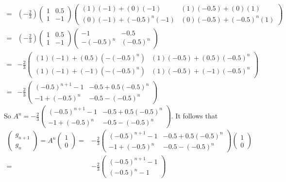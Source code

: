 \documentclass[12pt]{article}
\newenvironment{solution}[1][Solution]
{
	\begin{trivlist} 
		\item[\hskip \labelsep {\itshape #1:}]
	}
	{
	\end{trivlist}
}
\begin{document}
\begin{solution}
\begin{align*}
=&\left( -\frac{2}{3} \right) \begin{pmatrix}1&0.5\\1&-1\end{pmatrix} \begin{pmatrix} (1)(-1)+(0)(-1)&(1)(-0.5)+(0)(1)\\(0)(-1)+(-0.5)^{n} (-1) & (0)(-0.5)+(-0.5)^{n} (1)\end{pmatrix} &\\
=& \left( -\frac{2}{3} \right) \begin{pmatrix}1&0.5\\1&-1\end{pmatrix} \begin{pmatrix} -1&-0.5\\-(-0.5)^{n}&(-0.5)^{n}\end{pmatrix} &\\
=&-\frac{2}{3} \begin{pmatrix}(1)(-1)+(0.5)(-(-0.5)^{n})& (1)(-0.5)+(0.5)(-0.5)^{n}\\(1)(-1)+(-1)(-(-0.5)^{n})&(1)(-0.5)+(-1)(-0.5)^{n}\end{pmatrix} &\\
=&-\frac{2}{3} \begin{pmatrix}(-0.5)^{n+1} -1&-0.5+0.5(-0.5)^{n}\\-1+(-0.5)^{n} & -0.5-(-0.5)^{n}\end{pmatrix}
\end{align*}
So $A^{n} = -\frac{2}{3} \begin{pmatrix}(-0.5)^{n+1} -1&-0.5+0.5(-0.5)^{n}\\-1+(-0.5)^{n} & -0.5-(-0.5)^{n}\end{pmatrix}$. It follows that
\begin{align*}
\begin{pmatrix}g_{n+1}\\g_{n}\end{pmatrix} = A^{n} \begin{pmatrix}1\\0\end{pmatrix} =& -\frac{2}{3} \begin{pmatrix}(-0.5)^{n+1} -1&-0.5+0.5(-0.5)^{n}\\-1+(-0.5)^{n} & -0.5-(-0.5)^{n}\end{pmatrix}\begin{pmatrix}1\\0\end{pmatrix} &\\
=& -\frac{2}{3} \begin{pmatrix}(-0.5)^{n+1} -1\\(-0.5)^{n}-1\end{pmatrix}

\end{align*}
\end{solution}
\end{document}
